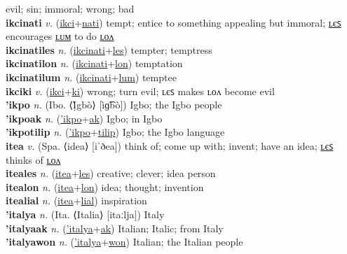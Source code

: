 evil; sin; immoral; wrong; bad \label{ikcilon} \\
\textbf{ikcinati} \textit{v.} (\hyperref[ikci]{ikci}+\hyperref[nati]{nati})
tempt; entice to something appealing but immoral; \hyperref[ikcinatiles]{ʟєꜱ} encourages \hyperref[ikcinatilum]{ʟᴜᴍ} to do \hyperref[ikcinatilon]{ʟᴏᴧ} \label{ikcinati} \\
\textbf{ikcinatiles} \textit{n.} (\hyperref[ikcinati]{ikcinati}+\hyperref[les]{les})
tempter; temptress \label{ikcinatiles} \\
\textbf{ikcinatilon} \textit{n.} (\hyperref[ikcinati]{ikcinati}+\hyperref[lon]{lon})
temptation \label{ikcinatilon} \\
\textbf{ikcinatilum} \textit{n.} (\hyperref[ikcinati]{ikcinati}+\hyperref[lum]{lum})
temptee \label{ikcinatilum} \\
\textbf{ikciki} \textit{v.} (\hyperref[ikci]{ikci}+\hyperref[ki]{ki})
wrong; turn evil; ʟєꜱ makes ʟᴏᴧ become evil \label{ikciki} \\
\textbf{'ikpo} \textit{n.} (Ibo. ⟨Ị̀gbò⟩ [ìɡ͡bò])
Igbo; the Igbo people \label{'ikpo} \\
\textbf{'ikpoak} \textit{n.} (\hyperref['ikpo]{'ikpo}+\hyperref[ak]{ak})
Igbo; in Igbo \label{'ikpoak} \\
\textbf{'ikpotilip} \textit{n.} (\hyperref['ikpo]{'ikpo}+\hyperref[tilip]{tilip})
Igbo; the Igbo language \label{'ikpotilip} \\
\textbf{itea} \textit{v.} (Spa. ⟨idea⟩ [iˈðea])
think of; come up with; invent; have an idea; \hyperref[iteales]{ʟєꜱ} thinks of \hyperref[itealon]{ʟᴏᴧ} \label{itea} \\
\textbf{iteales} \textit{n.} (\hyperref[itea]{itea}+\hyperref[les]{les})
creative; clever; idea person \label{iteales} \\
\textbf{itealon} \textit{n.} (\hyperref[itea]{itea}+\hyperref[lon]{lon})
idea; thought; invention \label{itealon} \\
\textbf{itealial} \textit{n.} (\hyperref[itea]{itea}+\hyperref[lial]{lial})
inspiration \label{itealial} \\
\textbf{'italya} \textit{n.} (Ita. ⟨Italia⟩ [itaːlja])
Italy \label{'italya} \\
\textbf{'italyaak} \textit{n.} (\hyperref['italya]{'italya}+\hyperref[ak]{ak})
Italian; Italic; from Italy \label{'italyaak} \\
\textbf{'italyawon} \textit{n.} (\hyperref['italya]{'italya}+\hyperref[won]{won})
Italian; the Italian people \label{'italyawon} \\
